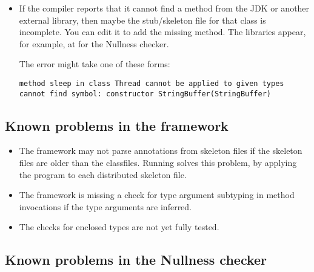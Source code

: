 \begin{itemize}
\item
If the compiler reports that it cannot find a method from the
JDK or another external library, then maybe the stub/skeleton file for that
class is incomplete.  You can edit it to add the missing method.  The
libraries appear, for example, at  for the
Nullness checker.

The error might take one of these forms:

\begin{Verbatim}
method sleep in class Thread cannot be applied to given types
cannot find symbol: constructor StringBuffer(StringBuffer)
\end{Verbatim}


\end{itemize}


\subsection{Known problems in the framework\label{known-problems}}

\begin{itemize}

\item
  The framework may not parse annotations from skeleton files if the
  skeleton files are older than the classfiles.  Running  solves this problem, by applying the 
   program to each distributed skeleton file.

\item The framework is missing a check for type argument subtyping in
  method invocations if the type arguments are inferred.

\item The checks for enclosed types are not yet fully tested.

\end{itemize}

\subsection{Known problems in the Nullness checker}


